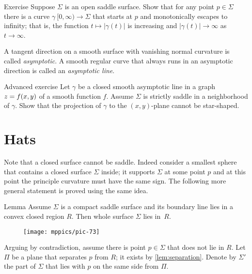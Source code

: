 \begin{thm}{Exercise}
Suppose $\Sigma$ is an open saddle surface.
Show that for any point $p\in \Sigma$ there is a curve $\gamma\:[0,\infty)\to\Sigma$ that starts at $p$ and monotonically escapes to infinity;
that is, the function $t\mapsto|\gamma(t)|$ is increasing and $|\gamma(t)|\to\infty$ as $t\to\infty$.
\end{thm}

A tangent direction on a smooth surface with vanishing normal curvature is called \emph{asymptotic}.
A smooth regular curve that always runs in an asymptotic direction is called an
\emph{asymptotic line}.\label{page:asymptotic line}

\begin{thm}{Advanced exercise}
Let $\gamma$ be a closed smooth asymptotic line
in a graph $z\z=f(x,y)$ of a smooth function $f$. 
Assume $\Sigma$ is strictly saddle in a neighborhood of $\gamma$.
Show that the projection of $\gamma$ to the $(x,y)$-plane cannot be star-shaped. %
\end{thm}

\section*{Hats}

Note that a closed surface cannot be saddle.
Indeed consider a smallest sphere that contains a closed surface $\Sigma$ inside;
it supports $\Sigma$ at some point $p$ and at this point the principle curvature must have the same sign.
The following more general statement  is proved using the same idea.

\begin{thm}{Lemma}\label{lem:convex-saddle}
Assume $\Sigma$ is a compact saddle surface and its boundary line lies in a convex closed region $R$.
Then whole surface $\Sigma$ lies in~$R$.
\end{thm}

\begin{wrapfigure}{O}{50 mm}
\vskip-0mm
\centering
\texttt{[image: mppics/pic-73]}
\vskip0mm
\end{wrapfigure}

Arguing by contradiction,
assume there is point $p\in \Sigma$ that does not lie in $R$.
Let $\Pi$ be a plane that separates $p$ from $R$; it exists by \ref{lem:separation}.
Denote by $\Sigma'$ the part of $\Sigma$ that lies with $p$ on the same side from $\Pi$.

